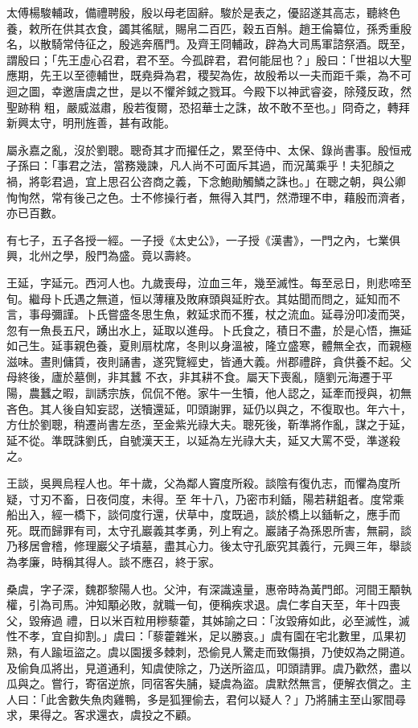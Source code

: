 \begin{pinyinscope}
 太傅楊駿輔政，備禮聘殷，殷以母老固辭。駿於是表之，優詔遂其高志，聽終色養，敕所在供其衣食，蠲其徭賦，賜帛二百匹，穀五百斛。趙王倫纂位，孫秀重殷名，以散騎常侍征之，殷逃奔鴈門。及齊王冏輔政，辟為大司馬軍諮祭酒。既至，謂殷曰；「先王虛心召君，君不至。今孤辟君，君何能屈也？」殷曰：「世祖以大聖應期，先王以至德輔世，既堯舜為君，稷契為佐，故殷希以一夫而距千乘，為不可迴之圖，幸邀唐虞之世，是以不懼斧鉞之戮耳。今殿下以神武睿姿，除殘反政，然聖跡稍
 粗，嚴威滋肅，殷若復爾，恐招華士之誅，故不敢不至也。」冏奇之，轉拜新興太守，明刑旌善，甚有政能。



 屬永嘉之亂，沒於劉聰。聰奇其才而擢任之，累至侍中、太保、錄尚書事。殷恒戒子孫曰：「事君之法，當務幾諫，凡人尚不可面斥其過，而況萬乘乎！夫犯顏之禍，將彰君過，宜上思召公咨商之義，下念鮑勛觸鱗之誅也。」在聰之朝，與公卿恂恂然，常有後己之色。士不修操行者，無得入其門，然滯理不申，藉殷而濟者，亦已百數。



 有七子，五子各授一經。一子授《太史公》，一子授《漢書》，一門之內，七業俱興，北州之學，殷門為盛。竟以壽終。



 王延，字延元。西河人也。九歲喪母，泣血三年，幾至滅性。每至忌日，則悲啼至旬。繼母卜氏遇之無道，恒以薄穰及敗麻頭與延貯衣。其姑聞而問之，延知而不言，事母彌謹。卜氏嘗盛冬思生魚，敕延求而不獲，杖之流血。延尋汾叩凌而哭，忽有一魚長五尺，踴出水上，延取以進母。卜氏食之，積日不盡，於是心悟，撫延如己生。延事親色養，夏則扇枕席，冬則以身溫被，隆立盛寒，體無全衣，而親極滋味。晝則傭賃，夜則誦書，遂究覽經史，皆通大義。州郡禮辟，貪供養不起。父母終後，廬於墓側，非其蠶
 不衣，非其耕不食。屬天下喪亂，隨劉元海遷于平陽，農蠶之暇，訓誘宗族，侃侃不倦。家牛一生犢，他人認之，延牽而授與，初無吝色。其人後自知妄認，送犢還延，叩頭謝罪，延仍以與之，不復取也。年六十，方仕於劉聰，稍遷尚書左丞，至金紫光祿大夫。聰死後，靳準將作亂，謀之于延，延不從。準既誅劉氏，自號漢天王，以延為左光祿大夫，延又大罵不受，準遂殺之。



 王談，吳興烏程人也。年十歲，父為鄰人竇度所殺。談陰有復仇志，而懼為度所疑，寸刃不畜，日夜伺度，未得。至
 年十八，乃密市利鍤，陽若耕鉏者。度常乘船出入，經一橋下，談伺度行還，伏草中，度既過，談於橋上以鍤斬之，應手而死。既而歸罪有司，太守孔巖義其孝勇，列上宥之。巖諸子為孫恩所害，無嗣，談乃移居會稽，修理巖父子墳墓，盡其心力。後太守孔廞究其義行，元興三年，舉談為孝廉，時稱其得人。談不應召，終于家。



 桑虞，字子深，魏郡黎陽人也。父沖，有深識遠量，惠帝時為黃門郎。河間王顒執權，引為司馬。沖知顒必敗，就職一旬，便稱疾求退。虞仁孝自天至，年十四喪父，毀瘠過
 禮，日以米百粒用糝藜藿，其姊諭之曰：「汝毀瘠如此，必至滅性，滅性不孝，宜自抑割。」虞曰：「藜藿雜米，足以勝哀。」虞有園在宅北數里，瓜果初熟，有人踰垣盜之。虞以園援多棘刺，恐偷見人驚走而致傷損，乃使奴為之開道。及偷負瓜將出，見道通利，知虞使除之，乃送所盜瓜，叩頭請罪。虞乃歡然，盡以瓜與之。嘗行，寄宿逆旅，同宿客失脯，疑虞為盜。虞默然無言，便解衣償之。主人曰：「此舍數失魚肉雞鴨，多是狐狸偷去，君何以疑人？」乃將脯主至山冢間尋求，果得之。客求還衣，虞投之不顧。




\end{pinyinscope}
